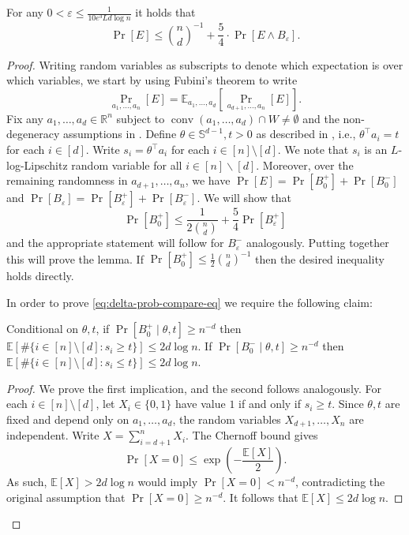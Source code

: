 \documentclass{article}\usepackage[a4paper,margin=20mm]{geometry}
\newcommand{\R}{\mathbb R}
\newcommand{\E}{\mathbb E}
\newcommand{\T}{\top}
\newcommand{\sfe}{\mathbb{S}^{d-1}}
\newcommand{\eps}{\varepsilon} %
\newcommand{\conv}{\operatorname{conv}}
\begin{document}
\begin{lemma}\label{lem:delta-prob-compare}
For any $0 < \eps \leq \frac{1}{10e^3 L d\log n}$ it holds that
\[
\Pr[E] \leq \binom{n}{d}^{-1} + \frac{5}{4} \cdot \Pr[E \wedge B_\eps].
\]
\end{lemma}
\begin{proof}
    Writing random variables as subscripts to denote which expectation is over which variables,
    we start by using Fubini's theorem to write
    $$\Pr_{a_1,\dots,a_n}[E] = \E_{a_1,\dots,a_d}[ \Pr_{a_{d+1},\dots,a_n}[E]].$$
    Fix any $a_1,\dots,a_d \in \R^n$ subject to \mbox{$\conv(a_1,\dots,a_d) \cap W \neq \emptyset$} and the non-degeneracy assumptions in .
    Define $\theta \in \sfe, t > 0$ as described in , i.e., $\theta^\top a_i = t$ for each $i \in [d]$.
    Write $s_i = \theta^\T a_i$ for each $i \in [n]\setminus [d]$.
    We note that $s_i$ is an $L$-log-Lipschitz random variable for all $i \in [n] \backslash [d]$.
    Moreover, over the remaining randomness in $a_{d+1},\dots,a_n$, we have
    $\Pr[E] = \Pr[B_0^+] + \Pr[B_0^-]$ and $\Pr[B_\eps] = \Pr[B_\eps^+] + \Pr[B_\eps^-]$.
    We will show that
    \begin{equation}
        \Pr[B_0^+] \leq \frac{1}{2\binom{n}{d}} + \frac 5 4 \Pr[B_\eps^+] \label{eq:delta-prob-compare-eq}
    \end{equation}
    and the appropriate statement will follow for $B_\eps^-$ analogously.
    Putting together this will prove the lemma.
    If $\Pr[B_0^+] \leq \frac{1}{2}\binom n d^{-1}$ then the desired inequality holds directly.
    
    In order to prove \eqref{eq:delta-prob-compare-eq} we require the following claim:
    \begin{claim}\label{claim:highprobabilityimpliesfewnearbypoints}
        Conditional on $\theta, t$, if $\Pr[B_0^+ \mid \theta, t] \geq n^{-d}$
        then $\E[\#\{i \in [n] \setminus [d] : s_i \geq t\}] \leq 2 d\log n$.
        If $\Pr[B_0^- \mid \theta, t] \geq n^{-d}$
        then $\E[\#\{i \in [n] \setminus [d] : s_i \leq t\}] \leq 2 d\log n$.
    \end{claim}
    \begin{proof}
        We prove the first implication, and the second follows analogously.
        For each $i \in [n]\setminus[d]$, let $X_i \in \{0,1\}$ have value $1$
        if and only if $s_i \geq t$. Since $\theta, t$ are fixed
        and depend only on $a_1,\dots,a_d$, the random variables
        $X_{d+1},\dots,X_n$ are independent.
        Write $X = \sum_{i=d+1}^n X_i$. The Chernoff bound gives
        \[\Pr[X = 0]
        \leq \exp\left(-\frac{\E[X]}{2}\right).\]
        As such, \(\E[X] > 2d\log n\) would imply \(\Pr[X = 0] < n^{-d}\),
        contradicting the original assumption that \(\Pr[X = 0] \geq n^{-d}.\)
        It follows that \(\E[X] \leq 2d\log n\).
    \end{proof}


\end{proof}
\end{document}
